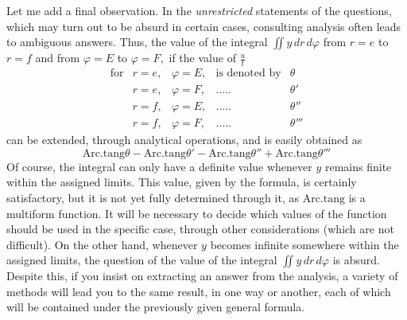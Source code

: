 \documentclass[14pt]{memoir}
\theoremstyle{plain}
\theoremstyle{remark}
\begin{document}
Let me add a final observation. In the \textit{unrestricted} statements of the questions, which may turn out to be absurd in certain cases, consulting analysis often leads to ambiguous answers. Thus, the value of the integral \(\iint y \, dr \, d\varphi\) from \(r=e\) to \(r=f\) and from \(\varphi = E\) to \(\varphi = F,\) if the value of \(\frac{u}{t}\)
\[ \begin{array}{ccccc} \text{for} & r=e,& \varphi = E ,& \text{is denoted by} &\theta \\
& r=e, & \varphi = F,& .\dots. &\theta' \\
& r=f, & \varphi = E,& .\dots. &\theta'' \\
& r=f, & \varphi = F,& .\dots. &\theta''' \end{array} \]
can be extended, through analytical operations, and is easily obtained as
\[ \mathrm{Arc.tang }\theta - \mathrm{Arc.tang }\theta' -\mathrm{Arc.tang }\theta''+\mathrm{Arc.tang }\theta''' \]
Of course, the integral can only have a definite value whenever \(y\) remains finite within the assigned limits. This value, given by the formula, is certainly satisfactory, but it is not yet fully determined through it, as \(\mathrm{Arc.tang}\) is a multiform function. It will be necessary to decide which values of the function should be used in the specific case, through other considerations (which are not difficult). On the other hand, whenever \(y\) becomes infinite somewhere within the assigned limits, the question of the value of the integral \(\iint y \, dr \, d\varphi\) is absurd. Despite this, if you insist on extracting an answer from the analysis, a variety of methods will lead you to the same result, in one way or another, each of which will be contained under the previously given general formula.
\end{document}
